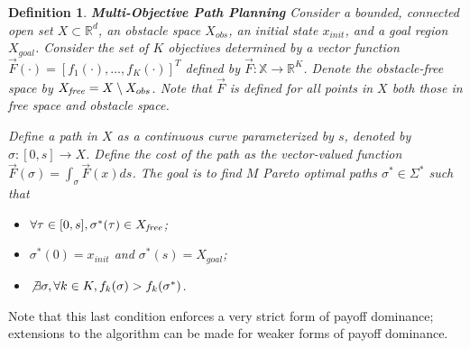 \documentclass[conference]{IEEEtran}
\newtheorem{defn}{Definition}
\begin{document}
\begin{defn}{ \textbf{Multi-Objective Path Planning} }
Consider a bounded, connected open set $ X \subset \mathbb{R}^{d} $, an obstacle space $ X_{obs} $, an initial state $ x_{init} $, and a goal region $ X_{goal} $. 
Consider the set of $K$ objectives determined by a vector function $ \vec{F}(\cdot) = [ f_{1} (\cdot), \ldots , f_{K}(\cdot) ]^{T}$ defined by $\vec{F}: \mathbb X \rightarrow \mathbb{R}^{K} $. 
Denote the obstacle-free space by $ X_{\it free} = X \setminus X_{obs} $. Note that $\vec{F}$ is defined for all points in $X$ both those in free space and obstacle space.

Define a {\em path} in $X$ as a continuous curve parameterized by $s$, denoted by $\sigma : [0,s] \rightarrow X$. 
Define the cost of the path as the vector-valued function $ \vec{F}(\sigma) = \int_{\sigma} \vec{F}(x)ds $.  
The goal is to find $ M $ Pareto optimal paths $ \sigma^{*} \in \Sigma^{*}$ such that
\begin{itemize}
	\item $\forall \tau\in[0,s], \sigma^*(\tau) \in X_{\it free}$;
	\item $ \sigma^{*} (0) = x_{init} $ and $ \sigma^{*} (s) = X_{goal}  $;
	\item $ \not \exists \sigma , \forall k \in K, f_{k} (\sigma) > f_{k} (\sigma^{*}) $.
\end{itemize}
\end{defn}
\noindent Note that this last condition enforces a very strict form of payoff dominance; extensions to the algorithm can be made for weaker forms of payoff dominance.
\end{document}
